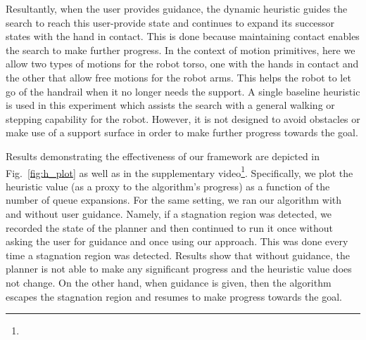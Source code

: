 \documentclass[conference]{IEEEtran}
\begin{document}
Resultantly, when the user provides guidance, the dynamic heuristic guides the search to reach this user-provide state and continues to expand its successor states with the hand in contact.
This is done because maintaining contact enables the search to make further progress. 
In the context of motion primitives, here we allow two types of motions for the robot torso, one with the hands in contact and the other that allow free motions for the robot arms. This helps the robot to let go of the handrail when it no longer needs the support. A single baseline heuristic is used in this experiment which assists the search with a general walking or stepping capability for the robot.
However, it is not designed to avoid obstacles or make use of a support surface in order to make further progress towards the goal.


Results demonstrating the effectiveness of our framework are depicted in Fig.~\ref{fig:h_plot}
as well as in the supplementary video\footnote{
}.
Specifically, we plot the heuristic value (as a proxy to the algorithm's progress) as a function of the number of queue expansions.
For the same setting, we ran our algorithm with and without user guidance.
Namely, if a stagnation region was detected, we recorded the state of the planner and then continued to run it once without asking the user for guidance and once using our approach. This was done every time a stagnation region was detected. 
Results show that without guidance, the planner is not able to make any significant progress and the heuristic value does not change.
On the other hand, when guidance is given, then the algorithm escapes the stagnation region and resumes to make progress towards the goal.
\end{document}
